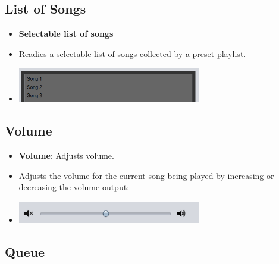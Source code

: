 \documentclass{article}
\begin{document}
\subsection{List of Songs}

\begin{itemize}
    \item \textbf{Selectable list of songs}
        \item[] Readies a selectable list of songs collected by a preset playlist.
        \item[] \includegraphics[width=8cm]{Images/ListOfSongs.png}
\end{itemize}

\subsection{Volume}

\begin{itemize}
    \item \textbf{Volume}: Adjusts volume.
        \item[] Adjusts the volume for the current song being played by increasing or decreasing the volume output:
        \item[] \includegraphics[width=8cm]{Images/Volume.png}
\end{itemize}

\subsection{Queue}
\end{document}
